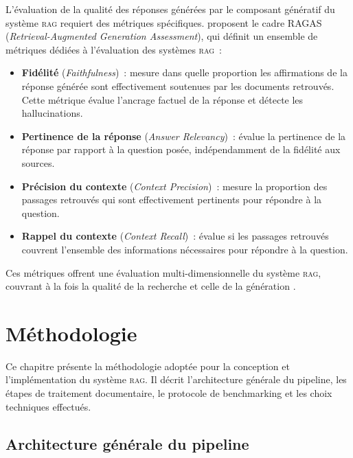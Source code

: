 \documentclass[12pt,a4paper,oneside]{report}
\newcommand{\rag}{\textsc{rag}}
\begin{document}
L'évaluation de la qualité des réponses générées par le composant génératif du système \rag{} requiert des métriques spécifiques. \citet{es2024ragas} proposent le cadre RAGAS (\textit{Retrieval-Augmented Generation Assessment}), qui définit un ensemble de métriques dédiées à l'évaluation des systèmes \rag{}~:

\begin{itemize}
  \item \textbf{Fidélité} (\textit{Faithfulness})~: mesure dans quelle proportion les affirmations de la réponse générée sont effectivement soutenues par les documents retrouvés. Cette métrique évalue l'ancrage factuel de la réponse et détecte les hallucinations.
  \item \textbf{Pertinence de la réponse} (\textit{Answer Relevancy})~: évalue la pertinence de la réponse par rapport à la question posée, indépendamment de la fidélité aux sources.
  \item \textbf{Précision du contexte} (\textit{Context Precision})~: mesure la proportion des passages retrouvés qui sont effectivement pertinents pour répondre à la question.
  \item \textbf{Rappel du contexte} (\textit{Context Recall})~: évalue si les passages retrouvés couvrent l'ensemble des informations nécessaires pour répondre à la question.
\end{itemize}

Ces métriques offrent une évaluation multi-dimensionnelle du système \rag{}, couvrant à la fois la qualité de la recherche et celle de la génération \citep{es2024ragas}.


\chapter{Méthodologie}
\label{chap:methodologie}

Ce chapitre présente la méthodologie adoptée pour la conception et l'implémentation du système \rag{}. Il décrit l'architecture générale du pipeline, les étapes de traitement documentaire, le protocole de benchmarking et les choix techniques effectués.

\section{Architecture générale du pipeline}
\end{document}
